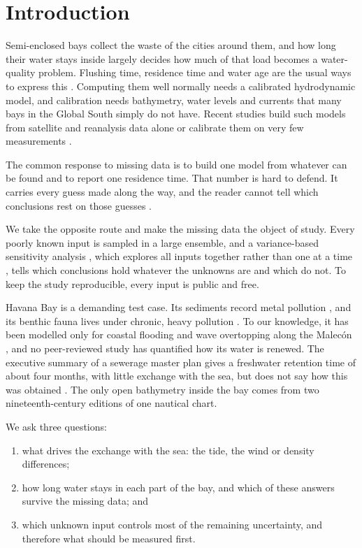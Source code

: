 \documentclass[a4paper,fleqn]{ems-dc}
\begin{document}
\section{Introduction}\label{sec:intro}
Semi-enclosed bays collect the waste of the cities around them, and how long their water
stays inside largely decides how much of that load becomes a water-quality problem.
Flushing time, residence time and water age are the usual ways to express this
\citep{Monsen2002,Deleersnijder2001,Lucas2020}. Computing them well normally needs a calibrated
hydrodynamic model, and calibration needs bathymetry, water levels and currents that many
bays in the Global South simply do not have. Recent studies build such models from
satellite and reanalysis data alone \citep{Payandeh2026} or calibrate them on very few
measurements \citep{RodriguesDoAmaral2025}.

The common response to missing data is to build one model from whatever can be found and to
report one residence time. That number is hard to defend. It carries every guess made along
the way, and the reader cannot tell which conclusions rest on those guesses
\citep{Uusitalo2015}.

We take the opposite route and make the missing data the object of study. Every poorly
known input is sampled in a large ensemble, and a variance-based sensitivity analysis
\citep{Sobol2001,Saltelli2008,Saltelli2010}, which explores all inputs together rather than one at a time
\citep{Saltelli2019,Pianosi2016,Razavi2021}, tells which conclusions hold whatever the unknowns are and which do
not. To keep the study reproducible, every input is public and free.

Havana Bay is a demanding test case. Its sediments record metal pollution
\citep{DiazAsencio2011}, and its benthic fauna lives under chronic, heavy pollution
\citep{Armenteros2009}. To our knowledge, it has been modelled only for coastal flooding
and wave overtopping along the Malec\'on \citep{PoncePortela2016,CordovaDeHorta2025}, and
no peer-reviewed study has quantified how its water is renewed. The executive summary of a
sewerage master plan gives a freshwater retention time of about four months, with little
exchange with the sea, but does not say how this was obtained \citep{JICA2004}. The only
open bathymetry inside the bay comes from two nineteenth-century editions of one nautical
chart.

We ask three questions:

\begin{enumerate}[label=(\arabic*),leftmargin=2.2em,itemsep=0pt]
\item what drives the exchange with the sea: the tide, the wind or density differences;
\item how long water stays in each part of the bay, and which of these answers survive the
missing data; and
\item which unknown input controls most of the remaining uncertainty, and therefore what
should be measured first.
\end{enumerate}
\end{document}
